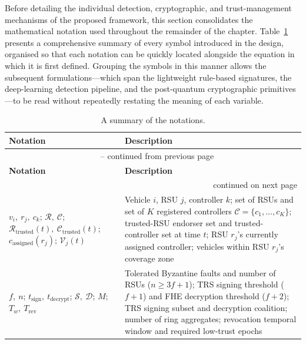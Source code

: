 \documentclass[12pt, a4paper]{report}
\begin{document}
Before detailing the individual detection, cryptographic, and
trust-management mechanisms of the proposed framework, this section
consolidates the mathematical notation used throughout the remainder
of the chapter. Table~\ref{tab_notations} presents a comprehensive
summary of every symbol introduced in the design, organised so that
each notation can be quickly located alongside the equation in which
it is first defined. Grouping the symbols in this manner allows the
subsequent formulations---which span the lightweight rule-based
signatures, the deep-learning detection pipeline, and the
post-quantum cryptographic primitives---to be read without repeatedly
restating the meaning of each variable.

\footnotesize
\begin{longtable}{|m{3.6cm}|m{9.0cm}|}
	\caption{A summary of the notations.}\label{tab_notations}\\
	\hline
	\textbf{Notation} & \textbf{Description} \\
	\hline
	\endfirsthead

	\multicolumn{2}{c}{\tablename\ \thetable\ -- continued from previous page} \\
	\hline
	\textbf{Notation} & \textbf{Description} \\
	\hline
	\endhead

	\hline
	\multicolumn{2}{r}{continued on next page} \\
\hline
	\endfoot

	\hline
	\endlastfoot

	$v_i,\ r_j,\ c_k$; $\mathcal{R},\ \mathcal{C}$; $\mathcal{R}_{\text{trusted}}(t),\ \mathcal{C}_{\text{trusted}}(t)$; $c_{\text{assigned}}(r_j)$; $\mathcal{V}_j(t)$ & Vehicle $i$, RSU $j$, controller $k$; set of RSUs and set of $K$ registered controllers $\mathcal{C}=\{c_1,\dots,c_K\}$; trusted-RSU endorser set and trusted-controller set at time $t$; RSU $r_j$'s currently assigned controller; vehicles within RSU $r_j$'s coverage zone \\
\hline
	$f,\ n$; $t_{\text{sign}},\ t_{\text{decrypt}}$; $\mathcal{S},\ \mathcal{D}$; $M$; $T_w,\ T_{\text{rev}}$ & Tolerated Byzantine faults and number of RSUs ($n\!\ge\!3f{+}1$); TRS signing threshold ($f{+}1$) and FHE decryption threshold ($f{+}2$); TRS signing subset and decryption coalition; number of ring aggregates; revocation temporal window and required low-trust epochs \\
\hline


\end{longtable}
\end{document}
